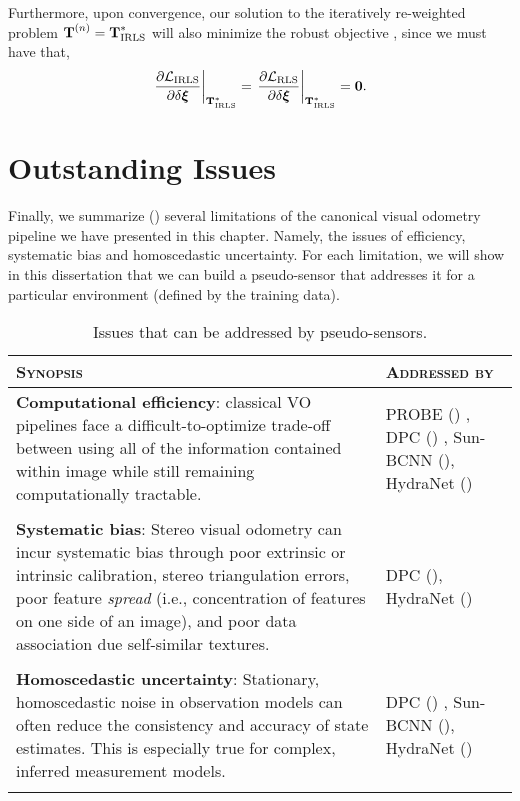 Furthermore, upon convergence, our solution to the iteratively re-weighted problem $\boldsymbol{\mathbf{T}}^{(n)} = \boldsymbol{\mathbf{T}}_\text{IRLS}^*$ will also minimize the robust objective , since we must have that,
\begin{equation}
	\left.\dfrac{\partial \mathcal{L}_{\text{IRLS}}}{\partial \delta \boldsymbol{\mathbf{\xi}}}\right|_{\boldsymbol{\mathbf{T}}_\text{IRLS}^*} = \left.\dfrac{\partial \mathcal{L}_{\text{RLS}}}{\partial \delta \boldsymbol{\mathbf{\xi}}}\right|_{\boldsymbol{\mathbf{T}}_\text{IRLS}^*} = \boldsymbol{\mathbf{0}}.
\end{equation}
 



\newpage
\section{Outstanding Issues}
Finally, we summarize () several limitations of the canonical visual odometry pipeline we have presented in this chapter. Namely, the issues of efficiency, systematic bias and homoscedastic uncertainty. For each limitation, we will show in this dissertation that we can build a pseudo-sensor that addresses it for a particular environment (defined by the training data).

\begin{table}[h!]
	\caption{Issues that can be addressed by pseudo-sensors.}	\begin{threeparttable}
	\begin{tabular}{m{}m{}}
		\toprule
		\textsc{Synopsis} & \textsc{Addressed by} \\ \midrule  
		\textbf{Computational efficiency}: classical VO pipelines face a difficult-to-optimize trade-off between using all of the information contained within image while still remaining computationally tractable.  & PROBE (\Cref{ch:probe}) , DPC (\Cref{ch:dpc}) , Sun-BCNN (\Cref{ch:sun-bcnn}), HydraNet (\Cref{ch:hydranet}) \\
		& \\
		\textbf{Systematic bias}: Stereo visual odometry can incur systematic bias through poor extrinsic or intrinsic calibration, stereo triangulation errors, poor feature \textit{spread} (i.e., concentration of features on one side of an image), and poor data association due self-similar textures. &  DPC (\Cref{ch:dpc}), HydraNet (\Cref{ch:hydranet}) \\
		& \\
		\textbf{Homoscedastic uncertainty}: Stationary, homoscedastic noise in observation models can often reduce the consistency and accuracy of state estimates. This is especially true for complex, inferred measurement models. &  DPC (\Cref{ch:dpc}) , Sun-BCNN (\Cref{ch:sun-bcnn}), HydraNet (\Cref{ch:hydranet})\\
		& \\
		\bottomrule
	\end{tabular}
	\label{tab:vo_outstanding_issues}
\end{threeparttable}
\end{table}


